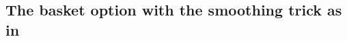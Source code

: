 \documentclass[11pt]{article}
\begin{document}







\subsection{The basket option with the smoothing trick as in \cite{bayersmoothing}}\label{sec:The basket option with smoothing trick with a time stepping procedure}
\end{document}
